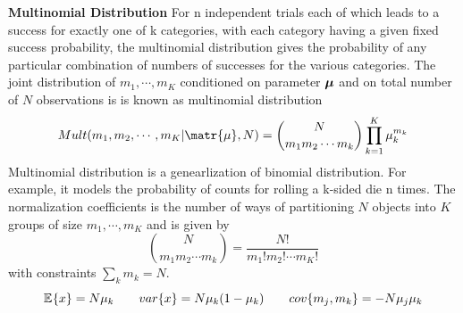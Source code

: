 \documentclass[11pt]{article}
\begin{document}
\begin{defn*}
    \textbf{Multinomial Distribution} For n independent trials each of which leads to a success for exactly one of k categories, with each category having a given fixed success probability, the multinomial distribution gives the probability of any particular combination of numbers of successes for the various categories. The joint distribution of $m_1,\cdots, m_K$ conditioned on parameter $\boldsymbol{\mu}$ and on total number of $N$ observations is is known as multinomial distribution 
    \[
        Mult(m_1,m_2,\cdots, m_K | \matr{\mu}, N) = 
        \binom{N}{m_1 m_2 \cdots m_k} \prod_{k=1}^K \mu_k^{m_k}
    \]
    Multinomial distribution is a genearlization of binomial distribution. For example, it models the probability of counts for rolling a k-sided die n times. The normalization coefficients is the number of ways of partitioning $N$ objects into $K$ groups of size $m_1,\cdots, m_K$ and is given by 
    \[
        \binom{N}{m_1 m_2 \cdots m_k} = \frac{N!}{m_1!m_2!\cdots m_K!}
    \]
    with constraints $\textstyle \sum_k m_k = N$. 
    \[
        \mathbb{E}_{}\{x\} = N \mu_k 
        \quad\quad 
        var\{x\} = N\mu_k (1-\mu_k)    
        \quad\quad 
        cov\{m_j, m_k\} = -N \mu_j \mu_k
    \]
\end{defn*} 
\end{document}
